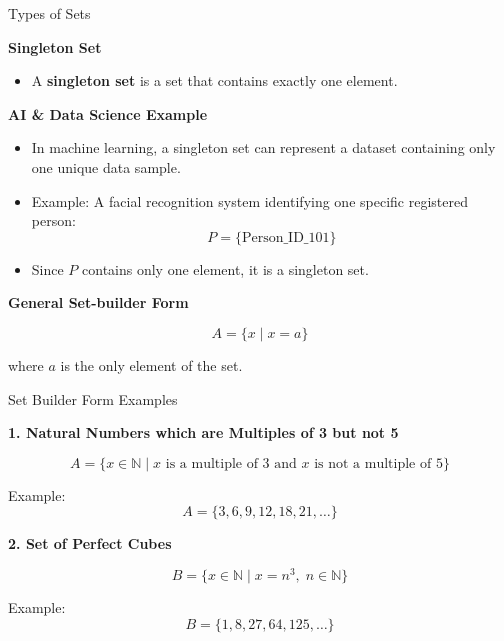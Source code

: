 \documentclass{beamer}
\begin{document}
\begin{frame}{Types of Sets}

\textbf{Singleton Set}

\begin{itemize}
    \item A \textbf{singleton set} is a set that contains exactly one element.
\end{itemize}

\vspace{0.3cm}

\textbf{AI \& Data Science Example}

\begin{itemize}
    \item In machine learning, a singleton set can represent a dataset containing only one unique data sample.
    \item Example: A facial recognition system identifying one specific registered person:
    \[
    P=\{\text{Person\_ID\_101}\}
    \]
    \item Since \(P\) contains only one element, it is a singleton set.
\end{itemize}

\vspace{0.3cm}

\textbf{General Set-builder Form}

\[
A=\{x \mid x=a\}
\]

where \(a\) is the only element of the set.

\end{frame}

\begin{frame}{Set Builder Form Examples}

\textbf{1. Natural Numbers which are Multiples of 3 but not 5}

\[
A=\{x \in \mathbb{N} \mid x \text{ is a multiple of 3 and } x \text{ is not a multiple of } 5\}
\]

Example:
\[
A=\{3,6,9,12,18,21,\ldots\}
\]

\vspace{0.4cm}

\textbf{2. Set of Perfect Cubes}

\[
B=\{x \in \mathbb{N} \mid x=n^3,\; n\in\mathbb{N}\}
\]

Example:
\[
B=\{1,8,27,64,125,\ldots\}
\]

\end{frame}
\end{document}
